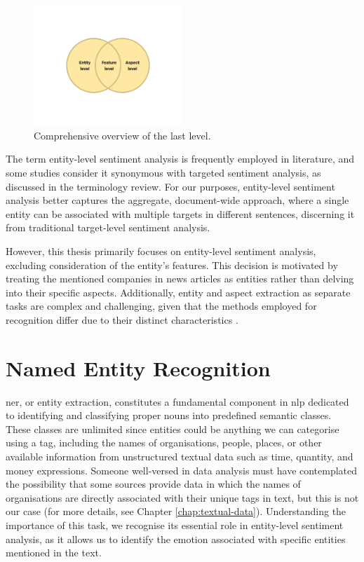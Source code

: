 \begin{figure}[htbp]
    \centering
    \includegraphics[width=0.5\textwidth]{img/theoretical/entity-feature-aspect-level.pdf}
    \caption{Comprehensive overview of the last level.}
    \label{fig:entity-feature-aspect-level}
\end{figure}

The term entity-level sentiment analysis is frequently employed in literature, and some studies consider it synonymous with targeted sentiment analysis, \linebreak as discussed \cite{ronningstad-etal-2022-entity} in the terminology review. For our purposes, entity-level sentiment analysis better captures the aggregate, document-wide approach, where a single entity can be associated with multiple targets in different sentences, discerning it from traditional target-level sentiment analysis. 

However, this thesis primarily focuses on entity-level sentiment analysis, excluding consideration of the entity's features. This decision is motivated by treating the mentioned companies in news articles as entities rather than delving into their specific aspects. Additionally, entity and aspect extraction as separate tasks are complex and challenging, given that the methods employed for recognition differ due to their distinct characteristics \parencite{Liu2015, Zhang2014}. 

\section{Named Entity Recognition}
\label{sec:named-entity-recognition}
\acrfull{ner}, or entity extraction, constitutes a fundamental component in \acrshort{nlp} dedicated to identifying and classifying proper nouns into predefined semantic classes. These classes are unlimited since entities could be anything we can categorise using a tag, including the names of organisations, people, places, or other available information from unstructured textual data such as time, quantity, and money expressions. Someone well-versed in data analysis must have contemplated the possibility that some sources provide data in which the names of organisations are directly associated with their unique tags in text, but this is not our case (for more details, see Chapter \ref{chap:textual-data}). Understanding the importance of this task, we recognise its essential role in entity-level sentiment analysis, as it allows us to identify the emotion associated with specific entities mentioned in the text.

